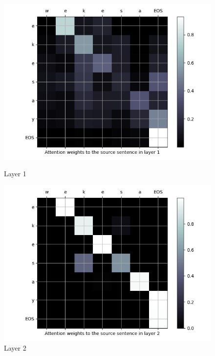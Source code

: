 \begin{enumarabic}
    \begin{figure}[H]
      \centering
      \begin{minipage}[b]{0.33\textwidth}
        \centering
        \includegraphics[width=\textwidth]{figures/wekesa-0.png}
        \caption{Layer 1}
        \label{fig:wekesa-0}
      \end{minipage}
      \hfill
      \begin{minipage}[b]{0.33\textwidth}
        \centering
        \includegraphics[width=\textwidth]{figures/wekesa-1.png}
        \caption{Layer 2}
        \label{fig:wekesa-1}
      \end{minipage}
      \begin{minipage}[b]{0.33\textwidth}

\end{minipage}
\end{figure}
\end{enumarabic}
